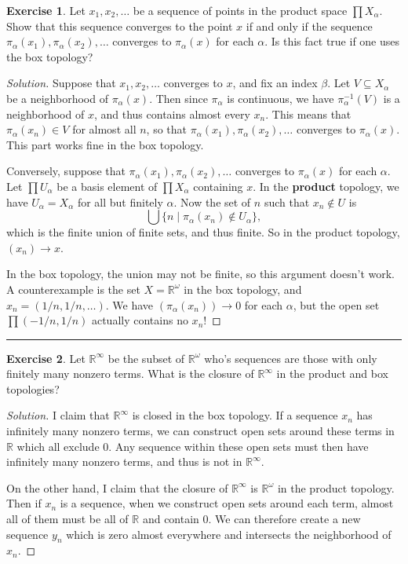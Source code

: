 \documentclass{article}
\theoremstyle{definition}
\newtheorem{exercise}{Exercise}[section]
\begin{document}
\begin{exercise}
  Let $x_1,x_2,\dots$ be a sequence of points in the product space $\prod X_\alpha$. Show that this sequence converges to the point $x$ if and only if the sequence $\pi_\alpha(x_1),\pi_\alpha(x_2),\dots$ converges to $\pi_\alpha(x)$ for each $\alpha$. Is this fact true if one uses the box topology?
\end{exercise}
\begin{proof}[Solution]
  Suppose that $x_1,x_2,\dots$ converges to $x$, and fix an index $\beta$. Let $V\subseteq X_\alpha$ be a neighborhood of $\pi_\alpha(x)$. Then since $\pi_\alpha$ is continuous, we have $\pi_\alpha^{-1}(V)$ is a neighborhood of $x$, and thus contains almost every $x_n$. This means that $\pi_\alpha(x_n)\in V$ for almost all $n$, so that $\pi_\alpha(x_1),\pi_\alpha(x_2),\dots$ converges to $\pi_\alpha(x)$. This part works fine in the box topology.

  Conversely, suppose that $\pi_\alpha(x_1),\pi_\alpha(x_2),\dots$ converges to $\pi_\alpha(x)$ for each $\alpha$. Let $\prod U_\alpha$ be a basis element of $\prod X_\alpha$ containing $x$. In the \textbf{product} topology, we have $U_\alpha = X_\alpha$ for all but finitely $\alpha$. Now the set of $n$ such that $x_n\notin U$ is
  $$\bigcup\{n\mid \pi_\alpha(x_n)\notin U_\alpha\},$$
  which is the finite union of finite sets, and thus finite. So in the product topology, $(x_n)\to x$.
  
  In the box topology, the union may not be finite, so this argument doesn't work. A counterexample is the set $X = \mathbb{R}^\omega$ in the box topology, and $x_n = (1/n,1/n,\dots)$. We have $(\pi_\alpha(x_n))\to 0$ for each $\alpha$, but the open set\\ $\prod(-1/n,1/n)$ actually contains no $x_n$!
\end{proof}

\hrule

\begin{exercise}
  Let $\mathbb{R}^\infty$ be the subset of $\mathbb{R}^\omega$ who's sequences are those with only finitely many nonzero terms. What is the closure of $\mathbb{R}^\infty$ in the product and box topologies?
\end{exercise}
\begin{proof}[Solution]
  I claim that $\mathbb{R}^\infty$ is closed in the box topology. If a sequence $x_n$ has infinitely many nonzero terms, we can construct open sets around these terms in $\mathbb{R}$ which all exclude 0. Any sequence within these open sets must then have infinitely many nonzero terms, and thus is not in $\mathbb{R}^\infty$.

  On the other hand, I claim that the closure of $\mathbb{R}^\infty$ is $\mathbb{R}^\omega$ in the product topology. Then if $x_n$ is a sequence, when we construct open sets around each term, almost all of them must be all of $\mathbb{R}$ and contain $0$. We can therefore create a new sequence $y_n$ which is zero almost everywhere and intersects the neighborhood of $x_n$.
\end{proof}
\end{document}
